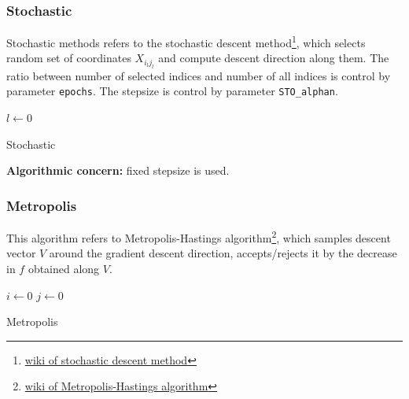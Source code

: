 \documentclass[11pt]{article}
\begin{document}
\subsubsection{Stochastic} 

Stochastic methods refers to the stochastic descent method\footnote{\href{https://en.wikipedia.org/wiki/Stochastic_gradient_descent}{wiki of stochastic descent method}}, which selects random set of coordinates $X_{i_{l}j_{l}}$ and compute descent direction along them. The ratio between number of selected indices and number of all indices is control by parameter {\tt epochs}. The stepsize is control by parameter {\tt STO\_alphan}.


\begin{algorithm}[H]
    \DontPrintSemicolon
	$l\gets 0$\;
    \caption{Stochastic}
    \label{alg:Stochastic}
\end{algorithm}

{\bf Algorithmic concern:} fixed stepsize is used.

\subsubsection{Metropolis} 

This algorithm refers to Metropolis-Hastings algorithm\footnote{\href{https://en.wikipedia.org/wiki/Metropolis-Hastings_algorithm}{wiki of Metropolis-Hastings algorithm}}, which samples descent vector $V$ around the gradient descent direction, accepts/rejects it by the decrease in $f$ obtained along $V$.

\begin{algorithm}[H]
    \DontPrintSemicolon
	$i\gets 0$\;
	$j\gets 0$\;
    \caption{Metropolis}
    \label{alg:Metropolis}
\end{algorithm}
\end{document}
